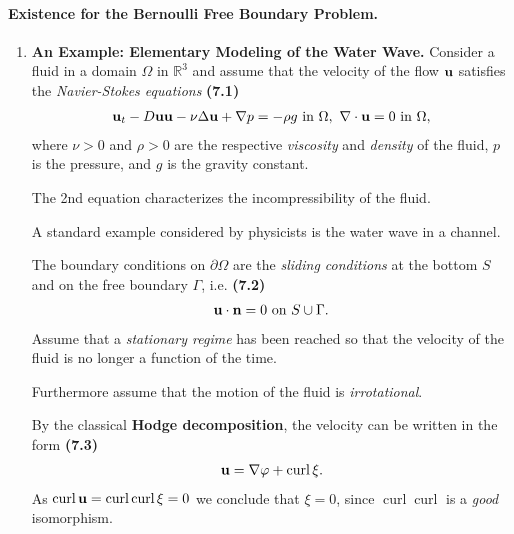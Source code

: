 \documentclass{book}
\numberwithin{equation}{section}
\begin{document}
\paragraph{Existence for the Bernoulli Free Boundary Problem.}
\begin{enumerate}
    \item \textbf{An Example: Elementary Modeling of the Water Wave.} Consider a fluid in a domain $\Omega$ in $\mathbb{R}^3$ and assume that the velocity of the flow ${\bf u}$ satisfies the \textit{Navier-Stokes equations} \textbf{(7.1)}
    \begin{align*}
        {\bf u}_t - D{\bf u}{\bf u} - \nu\Delta{\bf u} + \nabla p = -\rho g \mbox{ in } \Omega,\ \nabla\cdot{\bf u} = 0 \mbox{ in } \Omega,
    \end{align*}
    where $\nu > 0$ and $\rho > 0$ are the respective \textit{viscosity} and \textit{density} of the fluid, $p$ is the pressure, and $g$ is the gravity constant.
    
    The 2nd equation characterizes the incompressibility of the fluid.
    
    A standard example considered by physicists is the water wave in a channel.
    
    The boundary conditions on $\partial\Omega$ are the \textit{sliding conditions} at the bottom $S$ and on the free boundary $\Gamma$, i.e. \textbf{(7.2)}
    \begin{align*}
        {\bf u}\cdot{\bf n} = 0 \mbox{ on } S\cup\Gamma.
    \end{align*}
    Assume that a \textit{stationary regime} has been reached so that the velocity of the fluid is no longer a function of the time.
    
    Furthermore assume that the motion of the fluid is \textit{irrotational}.
    
    By the classical \textbf{Hodge decomposition}, the velocity can be written in the form \textbf{(7.3)}
    \begin{align*}
        {\bf u} = \nabla\varphi + \operatorname{curl}\xi.
    \end{align*}
    As $\operatorname{curl}{\bf u} = \operatorname{curl}\operatorname{curl}\xi = 0$ we conclude that $\xi = 0$, since $\operatorname{curl}\operatorname{curl}$ is a \textit{good} isomorphism.
    

\end{enumerate}
\end{document}
